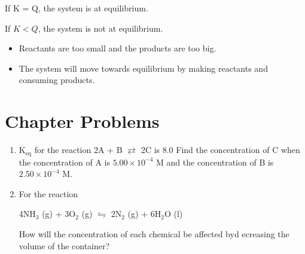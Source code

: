 \documentclass[../hchem.tex]{subfiles}
\begin{document}
If K = Q, the system is at equilibrium.

If $K<Q$, the system is not at equilibrium.
\begin{itemize}
    \item Reactants are too small and the products are too big.
    \item The system will move towards equilibrium by making reactants and consuming products.
\end{itemize}

\section*{Chapter Problems}
\begin{enumerate}
    \item K$_{\text{eq}}$ for the reaction 2A + B $\rightleftarrows$ 2C is 8.0 Find the concentration of C when the concentration of A is $5.00\times 10^{-4}$ M and the concentration of B is $2.50\times 10^{-4}$ M.
    \item For the reaction 
    \begin{center}
        4NH$_3$ (g) + 3O$_2$ (g) $\leftrightharpoons$ 2N$_2$ (g) + 6H$_2$O (l)
    \end{center}
    How will the concentration of each chemical be affected byd ecreasing the volume of the container?


\end{enumerate}
\end{document}
